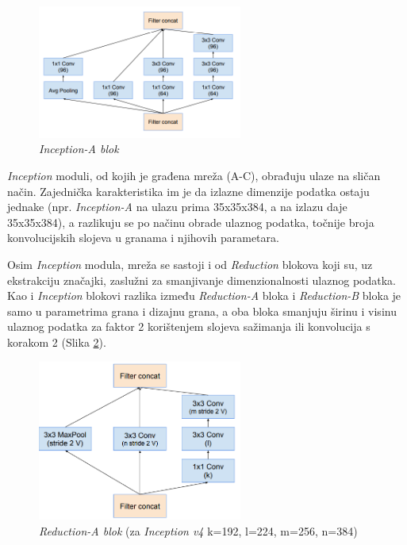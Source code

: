 \documentclass[times, utf8, proizvoljni, numeric]{fer}
\begin{document}
\begin{figure}[H]
	\begin{center}
		\captionsetup{justification=centering}
		\includegraphics[width=0.6\textwidth]{./imgs/inception_blok_a.png}
		\caption{\textit{Inception-A blok}  \cite{Inceptionv4}}
		\label{fg:inception_blok_a}
	\end{center}
\end{figure}

\textit{Inception} moduli, od kojih je građena mreža (A-C), obrađuju ulaze na sličan način. Zajednička karakteristika im je da izlazne dimenzije podatka ostaju jednake (npr. \textit{Inception-A} na ulazu prima 35x35x384, a na izlazu daje 35x35x384), a razlikuju se po načinu obrade ulaznog podatka, točnije broja konvolucijskih slojeva u granama i njihovih parametara.

Osim \textit{Inception} modula, mreža se sastoji i od \textit{Reduction} blokova koji su, uz ekstrakciju značajki, zaslužni za smanjivanje dimenzionalnosti ulaznog podatka. Kao i \textit{Inception} blokovi razlika između \textit{Reduction-A} bloka i \textit{Reduction-B} bloka je samo u parametrima grana i dizajnu grana, a oba bloka smanjuju širinu i visinu ulaznog podatka za faktor 2 korištenjem slojeva sažimanja ili konvolucija s korakom 2 (Slika \ref{fg:inception_reduction_a}).

\begin{figure}[!ht]
	\begin{center}
		\captionsetup{justification=centering}
		\includegraphics[width=0.6\textwidth]{./imgs/inception_reduction_a.png}
		\caption{\textit{Reduction-A blok} (za \textit{Inception v4} k=192, l=224, m=256, n=384) \cite{Inceptionv4}}
		\label{fg:inception_reduction_a}
	\end{center}
\end{figure}
\end{document}
